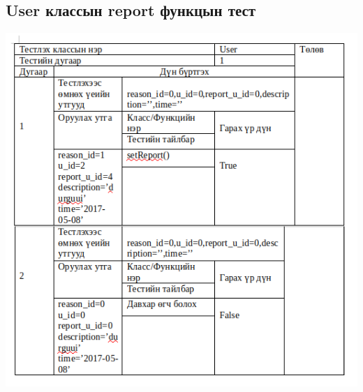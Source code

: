 \documentclass[
oneside, %
english, %
onehalfspacing, %
nolistspacing, %
headsepline, %
]{article} %
\begin{document}
      \subsection{User классын report функцын тест}
     \includegraphics[width=\textwidth]{test2}
     
     
\end{document}
